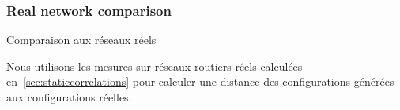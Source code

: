 %



\subsubsection{Real network comparison}{Comparaison aux réseaux réels}


Nous utilisons les mesures sur réseaux routiers réels calculées en~\ref{sec:staticcorrelations} pour calculer une distance des configurations générées aux configurations réelles.




